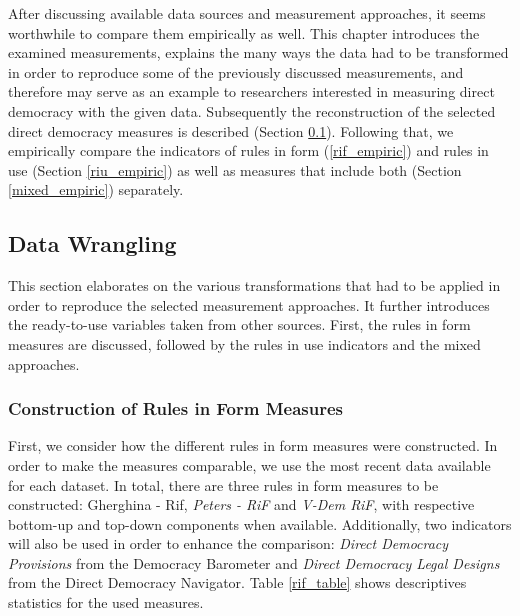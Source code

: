 \documentclass[]{article}
\title{}
\author{}
\date{}
\begin{document}
After discussing available data sources and measurement approaches, it
seems worthwhile to compare them empirically as well. This chapter
introduces the examined measurements, explains the many ways the data
had to be transformed in order to reproduce some of the previously
discussed measurements, and therefore may serve as an example to
researchers interested in measuring direct democracy with the given
data. Subsequently the reconstruction of the selected direct democracy
measures is described (Section \ref{data_wrangling}). Following that, we
empirically compare the indicators of rules in form (\ref{rif_empiric})
and rules in use (Section \ref{riu_empiric}) as well as measures that
include both (Section \ref{mixed_empiric}) separately.

\subsection{Data Wrangling} \label{data_wrangling}

This section elaborates on the various transformations that had to be
applied in order to reproduce the selected measurement approaches. It
further introduces the ready-to-use variables taken from other sources.
First, the rules in form measures are discussed, followed by the rules
in use indicators and the mixed approaches.

\subsubsection{Construction of Rules in Form
Measures}\label{construction-of-rules-in-form-measures}

First, we consider how the different rules in form measures were
constructed. In order to make the measures comparable, we use the most
recent data available for each dataset. In total, there are three rules
in form measures to be constructed: Gherghina - Rif, \emph{Peters - RiF}
and \emph{V-Dem RiF}, with respective bottom-up and top-down components
when available. Additionally, two indicators will also be used in order
to enhance the comparison: \emph{Direct Democracy Provisions} from the
Democracy Barometer and \emph{Direct Democracy Legal Designs} from the
Direct Democracy Navigator. Table \ref{rif_table} shows descriptives
statistics for the used measures.
\end{document}
